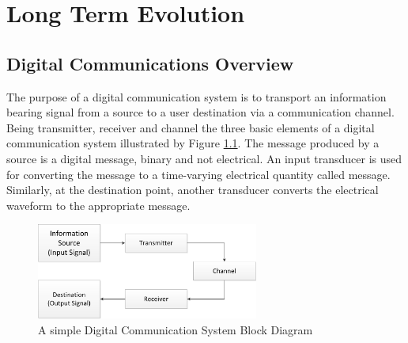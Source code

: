 \chapter{Long Term Evolution}
\label{chap:lte}

\section{Digital Communications Overview}
\label{lte:digicomm}

The purpose of a digital communication system is to transport an information
bearing signal from a source to a user destination via a communication channel.
Being transmitter, receiver and channel the three basic elements of a digital
communication system illustrated by Figure \ref{fig:digicomsimple}. The message
produced by a source is a digital message, binary and not electrical. An input
transducer is used for converting the message to a time-varying electrical
quantity called message. Similarly, at the destination point, another transducer
converts the electrical waveform to the appropriate message.


\begin{figure}[htbp]
    \centering
    \includegraphics[width=0.65\textwidth]{./figures/digicom_simple}
    \caption{ A simple Digital Communication System Block Diagram
    \label{fig:digicomsimple}}
\end{figure}


